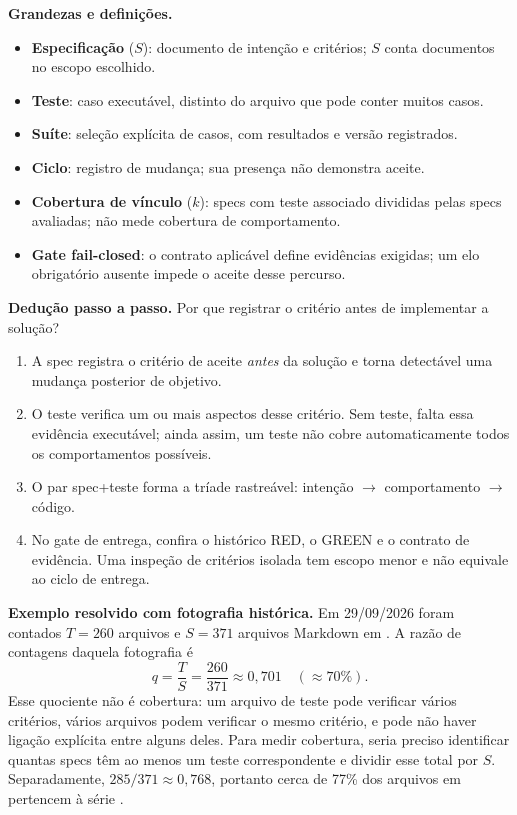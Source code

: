 \begin{definicao}
\textbf{Grandezas e definições.}
\begin{itemize}[leftmargin=1.3em,itemsep=1pt]
  \item \textbf{Especificação} ($S$): documento de intenção e critérios; $S$ conta documentos no escopo escolhido.
  \item \textbf{Teste}: caso executável, distinto do arquivo que pode conter muitos casos.
  \item \textbf{Suíte}: seleção explícita de casos, com resultados e versão registrados.
  \item \textbf{Ciclo}: registro de mudança; sua presença não demonstra aceite.
  \item \textbf{Cobertura de vínculo} ($k$): specs com teste associado divididas pelas specs avaliadas; não mede cobertura de comportamento.
  \item \textbf{Gate fail-closed}: o contrato aplicável define evidências exigidas; um elo obrigatório ausente impede o aceite desse percurso.
\end{itemize}
\end{definicao}

\begin{metodo}
\textbf{Dedução passo a passo.} Por que registrar o critério antes de implementar
a solução?
\begin{enumerate}[leftmargin=1.4em,itemsep=2pt]
  \item A spec registra o critério de aceite \emph{antes} da solução e torna detectável uma mudança posterior de objetivo.
  \item O teste verifica um ou mais aspectos desse critério. Sem teste, falta essa evidência executável; ainda assim, um teste não cobre automaticamente todos os comportamentos possíveis.
  \item O par spec+teste forma a tríade rastreável: intenção $\to$ comportamento $\to$ código.
  \item No gate de entrega, confira o histórico RED, o GREEN e o contrato de evidência. Uma inspeção de critérios isolada tem escopo menor e não equivale ao ciclo de entrega.
\end{enumerate}
\end{metodo}

\begin{resultado}
\textbf{Exemplo resolvido com fotografia histórica.} Em 29/09/2026 foram
contados $T=260$ arquivos  e $S=371$ arquivos Markdown
em . A razão de contagens daquela fotografia é
\[ q = \frac{T}{S} = \frac{260}{371} \approx 0{,}701 \quad (\approx 70\%). \]
Esse quociente não é cobertura: um arquivo de teste pode verificar vários
critérios, vários arquivos podem verificar o mesmo critério, e pode não haver
ligação explícita entre alguns deles. Para medir cobertura, seria preciso
identificar quantas specs têm ao menos um teste correspondente e dividir esse
total por $S$. Separadamente, $285/371 \approx 0{,}768$, portanto cerca de
77\% dos arquivos em  pertencem à série .
\end{resultado}

